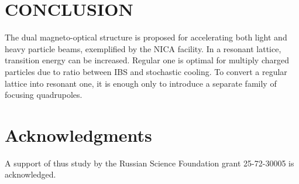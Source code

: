 \documentclass[a4paper,
               keeplastbox,   %
               ]{jacow}
\begin{document}
\section{CONCLUSION}

\par The dual magneto-optical structure is proposed for accelerating both light and heavy particle beams, exemplified by the NICA facility. In a resonant lattice, transition energy can be increased. Regular one is optimal for multiply charged particles due to ratio between IBS and stochastic cooling. To convert a regular lattice into resonant one, it is enough only to introduce a separate family of focusing quadrupoles.

\section{Acknowledgments}

\par A support of thus study by the Russian Science Foundation grant 25-72-30005 is acknowledged.
\end{document}
